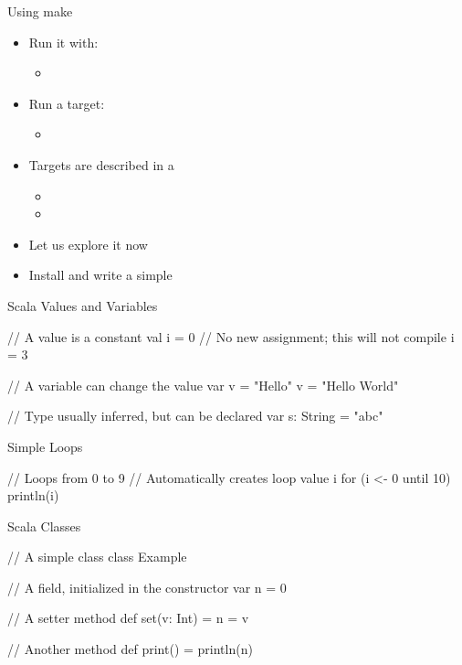 \begin{frame}[fragile]{Using make}
\begin{itemize}
\item Run it with:
\begin{itemize}
\item {}
\end{itemize}
\item Run a target:
\begin{itemize}
\item {}
\end{itemize}
\item Targets are described in a 
\begin{itemize}
\item {}
\item {}
\end{itemize}
\item Let us explore it now
\item Install  and write a simple 
\end{itemize}
\end{frame}

\begin{frame}[fragile]{Scala Values and Variables}
\begin{chisel}
// A value is a constant
val i = 0
// No new assignment; this will not compile
i = 3

// A variable can change the value
var v = "Hello"
v = "Hello World"

// Type usually inferred, but can be declared
var s: String = "abc"
\end{chisel}
\end{frame}

\begin{frame}[fragile]{Simple Loops}
\begin{chisel}
// Loops from 0 to 9
// Automatically creates loop value i
for (i <- 0 until 10) {
  println(i)
}
\end{chisel}
\end{frame}

\begin{frame}[fragile]{Scala Classes}
\begin{chisel}
// A simple class
class Example {
  // A field, initialized in the constructor
  var n = 0
  
  // A setter method
  def set(v: Int) = {
    n = v
  }
  
  // Another method
  def print() = {
    println(n)
  }
}
\end{chisel}
\end{frame}


